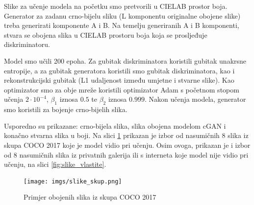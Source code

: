 
Slike za učenje modela na početku smo pretvorili u CIELAB prostor boja. Generator za zadanu crno-bijelu sliku (L komponentu originalne obojene slike) treba generirati komponente A i B.
Na temelju generiranih A i B komponenti, stvara se obojena slika u CIELAB prostoru boja koja se prosljeđuje diskriminatoru.

Model smo učili 200 epoha. Za gubitak diskriminatora koristili gubitak unakrsne entropije, a za gubitak generatora koristili smo gubitak diskriminatora, kao i rekonstrukcijski gubitak (L1 udaljenost između umjetne i stvarne slike). Kao optimizator smo za obje mreže koristili optimizator Adam s početnom stopom učenja $2 \cdot 10^{-4}$, $\beta_1$ iznosa $0.5$ te $\beta_2$ iznosa $0.999$.
Nakon učenja modela, generator smo koristili za bojenje crno-bijelih slika. 

Usporedno su prikazane: crno-bijela slika,  slika obojena modelom cGAN i konačno stvarna slika u boji. Na slici \ref{fig:slike_skup} prikazan je izbor od nasumičnih 8 slika iz skupa COCO 2017 koje je model vidio pri učenju. Osim ovoga, prikazan je i izbor od 8 nasumičnih slika iz privatnih galerija ili s interneta koje model nije vidio pri učenju, na slici \ref{fig:slike_vlastite}.

\begin{figure}[H]
    \centering
    \texttt{[image: imgs/slike\_skup.png]}
    \caption{Primjer obojenih slika iz skupa COCO 2017}
    \label{fig:slike_skup}
\end{figure}



